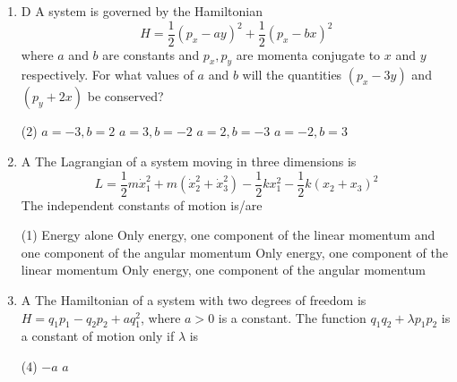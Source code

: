 \begin{enumerate}
{}
 \begin{tasks}(4)
	\task[\textbf{a.}]$\sqrt{2} p-x$
	\task[\textbf{b.}] $p-\sqrt{2} x$
	\task[\textbf{c.}]$p+\sqrt{2} x$
	\task[\textbf{d.}]  $x+\sqrt{2} p$
\end{tasks}
\item D A system is governed by the Hamiltonian
$$
H=\frac{1}{2}\left(p_{x}-a y\right)^{2}+\frac{1}{2}\left(p_{x}-b x\right)^{2}
$$
where $a$ and $b$ are constants and $p_{x}, p_{y}$ are momenta conjugate to $x$ and $y$ respectively.
For what values of $a$ and $b$ will the quantities $\left(p_{x}-3 y\right)$ and $\left(p_{y}+2 x\right)$ be conserved?
{}
 \begin{tasks}(2)
	\task[\textbf{a.}]$a=-3, b=2$
	\task[\textbf{b.}]$a=3, b=-2$
	\task[\textbf{c.}]$a=2, b=-3$
	\task[\textbf{d.}] $a=-2, b=3$
\end{tasks}
\item A The Lagrangian of a system moving in three dimensions is
$$
L=\frac{1}{2} m \dot{x}_{1}^{2}+m\left(\dot{x}_{2}^{2}+\dot{x}_{3}^{2}\right)-\frac{1}{2} k x_{1}^{2}-\frac{1}{2} k\left(x_{2}+x_{3}\right)^{2}
$$
The independent constants of motion is/are
{}
 \begin{tasks}(1)
	\task[\textbf{a.}]Energy alone
	\task[\textbf{b.}] Only energy, one component of the linear momentum and one component of the angular momentum
	\task[\textbf{c.}] Only energy, one component of the linear momentum
	\task[\textbf{d.}] Only energy, one component of the angular momentum
\end{tasks}
\item A The Hamiltonian of a system with two degrees of freedom is $H=q_{1} p_{1}-q_{2} p_{2}+a q_{1}^{2}$, where $a>0$ is a constant. The function $q_{1} q_{2}+\lambda p_{1} p_{2}$ is a constant of motion only if $\lambda$ is
{}
 \begin{tasks}(4)
	\task[\textbf{c.}]$-a$
	\task[\textbf{d.}]$a$ 
\end{tasks}
\end{enumerate}
\setlength\arrayrulewidth{1pt}
